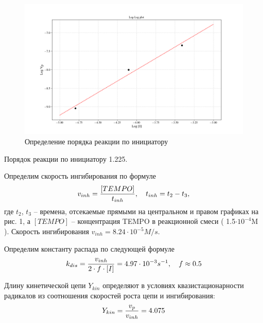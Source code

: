 \documentclass[12pt]{article}
\begin{document}
\begin{figure}[!ht]
	\includegraphics[width = 1.1\linewidth]{../loglog.png}
	\caption{Определение порядка реакции по инициатору}
\end{figure}

Порядок реакции по инициатору 1.225.

Определим скорость ингибирования по формуле
\begin{gather}
		v_{inh} = \frac{[TEMPO]}{t_{inh}}, \quad t_{inh} = t_2 - t_3, \notag
\end{gather}
где $t_2$, $t_3$ -- времена, отсекаемые прямыми на центральном и правом графиках на рис. 1, а $[TEMPO]$ -- концентрация TEMPO в реакционной смеси ( 1.5$\cdot 10^{-4}$M ). Скорость ингибирования $v_{inh} = 8.24 \cdot 10^{-5} M/s$. \par
Определим константу распада по следующей формуле
\begin{gather}
	k_{dis} = \frac{v_{inh}}{2 \cdot f \cdot [I]} = 4.97 \cdot 10^{-3} s^{-1}, \quad f \approx 0.5 \notag
\end{gather}

Длину кинетической цепи $Y_{kin}$ определяют в условиях квазистационарности радикалов из соотношения скоростей роста цепи и ингибирования:
\begin{gather}
		Y_{kin} = \frac{v_p}{v_{inh}} = 4.075 \notag
\end{gather}
\end{document}
